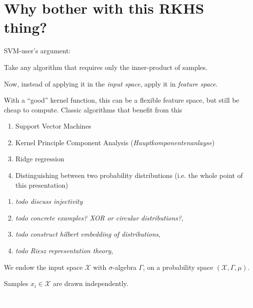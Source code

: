 \section{Why bother with this RKHS thing?}

SVM-user's argument:

Take any algorithm that requires only the inner-product of samples.

Now, instead of applying it in the \emph{input space}, apply it in \emph{feature space}.

With a ``good'' kernel function, this can be a flexible feature space, but still be cheap to compute.
\clearpage
Classic algorithms that benefit from this
\begin{enumerate}
\item Support Vector Machines
\item Kernel  Principle Component Analysis (\emph{Hauptkomponentenanlayse})
\item Ridge regression
\item Distinguishing between two probability distributions (i.e. the whole point of this presentation)
\end{enumerate}
\clearpage
\begin{enumerate}
\item \emph{todo discuss injectivity}
\item \emph{todo concrete examples? XOR or circular distributions?}, 
\item \emph{todo construct hilbert embedding of distributions}, 
\item \emph{todo Riesz representation theory}, 
\end{enumerate}
We endow the input space $\mathcal{X}$ with $\sigma$-algebra $\Gamma$,
on a probability space $(\mathcal{X}, \Gamma, \mu)$.

Samples $x_i \in \mathcal{X}$ are drawn independently.


\clearpage
\textcolor{white}{ %
Discussion, results, conclusion 
}


\ifoot{}%
\clearpage
%

 